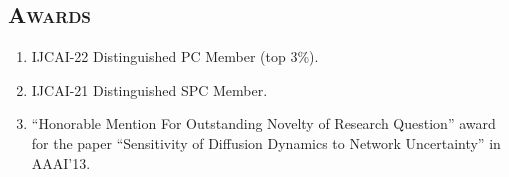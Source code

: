 \documentclass[margin,10pt]{res} %
\begin{document}
\begin{resume}
{\section{\textnormal{\textsc{Awards}}}
}
\begin{enumerate}[$\circ$]
    \item IJCAI-22 Distinguished PC Member (top 3\%).
    \item IJCAI-21 Distinguished SPC Member.
\iftoggle{compact}{}{
   \item ``DSFEW Early Career Researchers Travel Fund'', KDD 2016.
   }
\item ``Honorable Mention For Outstanding Novelty of Research
Question'' award for the paper ``Sensitivity of Diffusion Dynamics to
Network Uncertainty'' in AAAI'13.
\iftoggle{compact}{}{
\item Infosys Fellow: awarded to select
PhD candidates in IISc by Infosys Technologies Ltd. 
\item Secured All India Rank of 34 in GATE 2000 (EC), a national level
entrance exam for post graduate studies.
\item Ranked 7th in Bangalore University in Telecommunication Engg. (Year 2000).
   }
\end{enumerate}

\end{resume}
\end{document}
